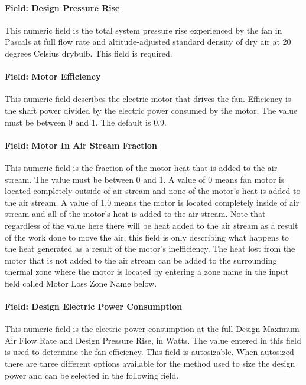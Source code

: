 \paragraph{Field: Design Pressure Rise}\label{field-pressure-fansysmodel}

This numeric field is the total system pressure rise experienced by the fan in Pascals at full flow rate and altitude-adjusted standard density of dry air at 20 degrees Celsius drybulb. This field is required.

\paragraph{Field: Motor Efficiency}\label{field-motor-eff-fansysmodel}

This numeric field describes the electric motor that drives the fan.  Efficiency is the shaft power divided by the electric power consumed by the motor.  The value must be between 0 and 1. The default is 0.9.

\paragraph{Field: Motor In Air Stream Fraction}\label{field-motor-in-air-stream-fansysmodel}

This numeric field is the fraction of the motor heat that is added to the air stream.  The value must be between 0 and 1.  A value of 0 means fan motor is located completely outside of air stream and none of the motor's heat is added to the air stream.  A value of 1.0 means the motor is located completely inside of air stream and all of the motor's heat is added to the air stream.  Note that regardless of the value here there will be heat added to the air stream as a result of the work done to move the air, this field is only describing what happens to the heat generated as a result of the motor's inefficiency. The heat lost from the motor that is not added to the air stream can be added to the surrounding thermal zone where the motor is located by entering a zone name in the input field called Motor Loss Zone Name below.

\paragraph{Field: Design Electric Power Consumption}\label{field-design-elec-power-fansysmodel}

This numeric field is the electric power consumption at the full Design Maximum Air Flow Rate and Design Pressure Rise, in Watts.  The value entered in this field is used to determine the fan efficiency. This field is autosizable.  When autosized there are three different options available for the method used to size the design power and can be selected in the following field.

